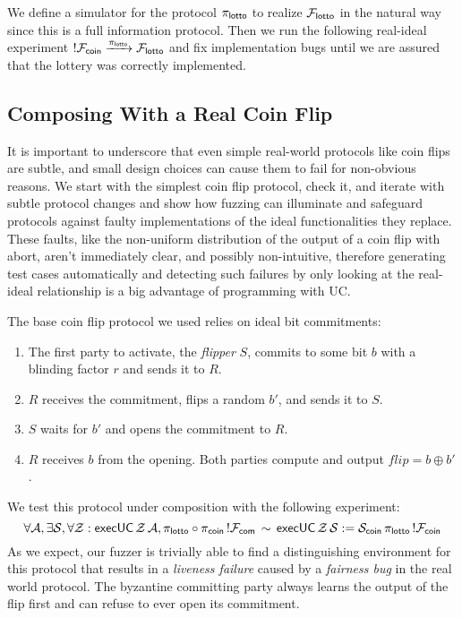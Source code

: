 We define a simulator for the protocol $\pi_{{\mathsf {lotto}}}$ to realize
$\mathcal{F}_{{\mathsf {lotto}}}$ in the natural way since this is a full information protocol.
Then we run the following real-ideal experiment $!\mathcal{F}_{{\mathsf {coin}}}
\xrightarrow{\pi_{{\mathsf {lotto}}}} \mathcal{F}_{{\mathsf {lotto}}}$ and fix implementation bugs until we
are assured that the lottery was correctly implemented.

\subsection{Composing With a Real Coin Flip}
It is important to underscore that even simple real-world protocols like coin
flips are subtle, and small design choices can cause them to fail for
non-obvious reasons.  We start with the simplest coin flip protocol, check it,
and iterate with subtle protocol changes and show how fuzzing can illuminate
and safeguard protocols against faulty implementations of the ideal
functionalities they replace. 
These faults, like the non-uniform distribution of the output of a coin flip
with abort, aren't immediately clear, and possibly non-intuitive, therefore
generating test cases automatically and detecting such failures by only looking
at the real-ideal relationship is a big advantage of programming with UC.

The base coin flip protocol we used relies on ideal bit commitments:
\begin{enumerate}
    \item The first party to activate, the \emph{flipper} $S$, commits to some bit
        $b$ with a blinding factor $r$ and sends it to $R$.  \item $R$ receives the
        commitment, flips a random $b'$, and sends it to $S$.
    \item $S$ waits for $b'$ and opens the commitment to $R$.
    \item $R$ receives $b$ from the opening. Both parties compute and output $flip
        = b \oplus b'$.
\end{enumerate}

We test this protocol under composition with the following experiment:
$$\forall \mathcal{A}, \exists \mathcal{S}, \forall \mathcal{Z}: {\mathsf {execUC}} \, \mathcal{Z} \, \mathcal{A}, \pi_{{\mathsf {lotto}}} \circ \pi_{{\mathsf {coin}}} \, !\mathcal{F}_{{\mathsf {com}}} \, \sim \, {\mathsf {execUC}} \, \mathcal{Z} \, \mathcal{S} := \mathcal{S}_{{\mathsf {coin}}} \, \pi_{{\mathsf {lotto}}} \, !\mathcal{F}_{{\mathsf {coin}}}$$
As we expect, our fuzzer is trivially able to find a distinguishing environment
for this protocol that results in a \emph{liveness failure} caused by a
\emph{fairness bug} in the real world protocol.  The byzantine committing party
always learns the output of the flip first and can refuse to ever open its
commitment.

